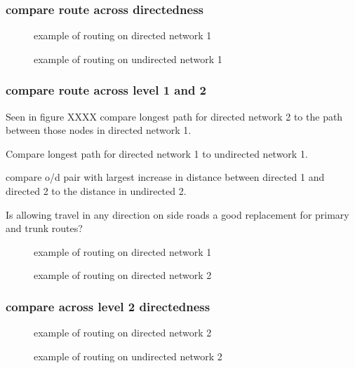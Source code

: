 \subsubsection{compare route across directedness}
\begin{figure}
\centering
\caption{example of routing on directed network 1}
\label{fig:routing_1}
\end{figure}

\begin{figure}
\centering
\caption{example of routing on undirected network 1}
\label{fig:routing_1}
\end{figure}

\subsubsection{compare route across level 1 and 2}

Seen in figure XXXX  compare longest path for directed network 2 to the path between those nodes in directed network 1. 

Compare longest path for directed network 1 to undirected network 1. 

compare o/d pair with largest increase in distance between directed 1 and directed 2 to the distance in undirected 2. 

Is allowing travel in any direction on side roads a good replacement for primary and trunk routes?


\begin{figure}
\centering
\caption{example of routing on directed network 1}
\label{fig:routing_1}
\end{figure}

\begin{figure}
\centering
\caption{example of routing on directed network 2}
\label{fig:routing_1}
\end{figure}

\subsubsection{compare across level 2 directedness}

\begin{figure}
\centering
\caption{example of routing on directed network 2}
\label{fig:routing_1}
\end{figure}

\begin{figure}
\centering
\caption{example of routing on undirected network 2}
\label{fig:routing_1}
\end{figure}


